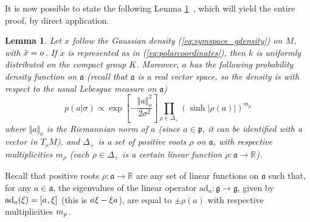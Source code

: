 \documentclass[draftclsnofoot]{IEEEtran}
\newtheorem{lem}{Lemma}
\begin{document}
It is now possible to state the following Lemma \ref{lem:rgdsym}~\cite{Sa17}\cite{habilitation}, which will yield the entire proof, by direct application.
\begin{lem} \label{lem:rgdsym}
Let $x$ follow the Gaussian density (\ref{eq:symspace_gdensity}) on $M$, with $\bar{x} = o\hspace{0.03cm}$. If $x$ is represented as in (\ref{eq:polarcoordinates}), then $k$ is uniformly distributed on the compact group $K$. Moreover, $a$ has the following probability density function on $\mathfrak{a}$ (recall that $\mathfrak{a}$ is a real vector space, so the density is with respect to the usual Lebesgue measure on $\mathfrak{a}$)
\begin{equation} \label{eq:aadensity}
  p(a|\sigma) \propto \exp\left[-\frac{\Vert a\Vert^2_o}{2\sigma^2}\right]\prod_{\rho \in \Delta_+} \left(\sinh\left|\rho(a)\right|\right)^{m_\rho}
\end{equation}
where $\Vert a \Vert_o$ is the Riemannian norm of $a$ (since $a \in \mathfrak{p}$, it can be identified with a vector in $T_oM$), and $\Delta_+$ is a set of positive roots $\rho$ on $\mathfrak{a}$, with respective multiplicities $m_\rho$ (each $\rho \in \Delta_+$ is a certain linear function $\rho:\mathfrak{a} \rightarrow \mathbb{R}$).
\end{lem}
Recall that positive roots $\rho : \mathfrak{a} \rightarrow \mathbb{R}$ are any set of linear functions on $\mathfrak{a}$ such that, for any $a \in \mathfrak{a}$, the eigenvalues of the linear operator $\mathrm{ad}_a : \mathfrak{g} \rightarrow \mathfrak{g}$, given by $\mathrm{ad}_a(\xi) = [a\hspace{0.02cm},\xi]$ (this is $a\hspace{0.02cm}\xi - \xi a$), are equal to $\pm \rho(a)$ with respective multiplicities $m_\rho\hspace{0.03cm}$. 
\end{document}
